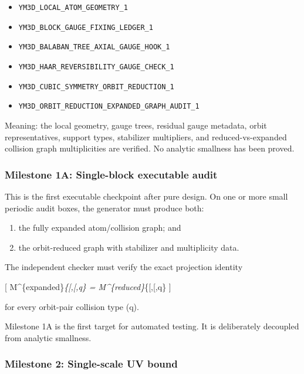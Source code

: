 \documentclass[
]{article}
\providecommand{\tightlist}{%
  \setlength{\itemsep}{0pt}\setlength{\parskip}{0pt}}
\begin{document}
\begin{itemize}
\tightlist
\item
  \texttt{YM3D\_LOCAL\_ATOM\_GEOMETRY\_1}
\item
  \texttt{YM3D\_BLOCK\_GAUGE\_FIXING\_LEDGER\_1}
\item
  \texttt{YM3D\_BALABAN\_TREE\_AXIAL\_GAUGE\_HOOK\_1}
\item
  \texttt{YM3D\_HAAR\_REVERSIBILITY\_GAUGE\_CHECK\_1}
\item
  \texttt{YM3D\_CUBIC\_SYMMETRY\_ORBIT\_REDUCTION\_1}
\item
  \texttt{YM3D\_ORBIT\_REDUCTION\_EXPANDED\_GRAPH\_AUDIT\_1}
\end{itemize}

Meaning: the local geometry, gauge trees, residual gauge metadata, orbit
representatives, support types, stabilizer multipliers, and
reduced-vs-expanded collision graph multiplicities are verified. No
analytic smallness has been proved.

\subsubsection{Milestone 1A: Single-block executable
audit}\label{milestone-1a-single-block-executable-audit}

This is the first executable checkpoint after pure design. On one or
more small periodic audit boxes, the generator must produce both:

\begin{enumerate}
\def\labelenumi{\arabic{enumi}.}
\tightlist
\item
  the fully expanded atom/collision graph; and
\item
  the orbit-reduced graph with stabilizer and multiplicity data.
\end{enumerate}

The independent checker must verify the exact projection identity

{[} M\^{}\{\rm expanded\}\emph{\{{[}\alpha{]},{[}\beta{]},q\} =
M\^{}\{\rm reduced\}}\{{[}\alpha{]},{[}\beta{]},q\} {]}

for every orbit-pair collision type (q).

Milestone 1A is the first target for automated testing. It is
deliberately decoupled from analytic smallness.

\subsubsection{Milestone 2: Single-scale UV
bound}\label{milestone-2-single-scale-uv-bound}
\end{document}

